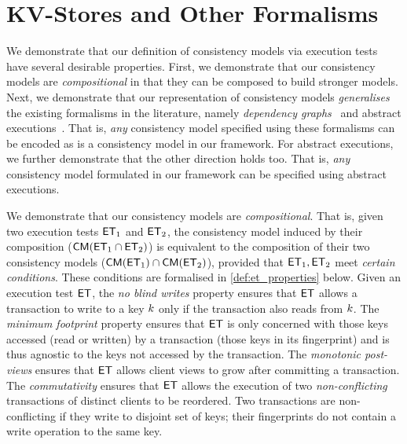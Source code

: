 \section{KV-Stores and Other Formalisms}
\label{sec:other_formalisms}
We demonstrate that our definition of consistency models via execution tests have several desirable properties. 
First, we demonstrate that our consistency models are \emph{compositional} in that they can be composed to build stronger models.
Next, we demonstrate that our representation of consistency models \emph{generalises} the existing formalisms in the literature, namely \emph{dependency graphs}~\cite{adya-icde} and abstract executions~\cite{??}. 
That is, \emph{any} consistency model specified using these formalisms can be encoded as is a consistency model in our framework. 
For abstract executions, we further demonstrate that the other direction holds too. 
That is, \emph{any} consistency model formulated in our framework can be specified using abstract executions. 




We demonstrate that our consistency models are \emph{compositional}.
That is, given two execution tests $\mathsf{ET}_1$ and $\mathsf{ET}_2$, the consistency model induced by their composition 
(\ie $\mathsf{CM}(\mathsf{ET}_1 \cap \mathsf{ET}_2)$) is equivalent to the composition of their two consistency models (\ie $\mathsf{CM}(\mathsf{ET}_1) \cap \mathsf{CM}(\mathsf{ET}_2)$), 
provided that $\mathsf{ET}_1, \mathsf{ET}_2$ meet \emph{certain conditions}.
These conditions are formalised in \cref{def:et_properties} below. 
Given an execution test $\mathsf{ET}$, 
the \emph{no blind writes} property ensures that $\mathsf{ET}$ allows a transaction to write to a key $k$ only if the transaction also reads from $k$. 
The \emph{minimum footprint} property ensures that $\mathsf{ET}$ is only concerned with those keys accessed (read or written) by a transaction (\ie those keys in its fingerprint) and is thus agnostic to the keys not accessed by the transaction. 
The \emph{monotonic post-views} ensures that $\mathsf{ET}$ allows client views to grow after committing a transaction. 
The \emph{commutativity} ensures that $\mathsf{ET}$ allows the execution of two \emph{non-conflicting} transactions of distinct clients to be reordered. 
Two transactions are non-conflicting if they write to disjoint set of keys; \ie their fingerprints do not contain a write operation to the same key. 

